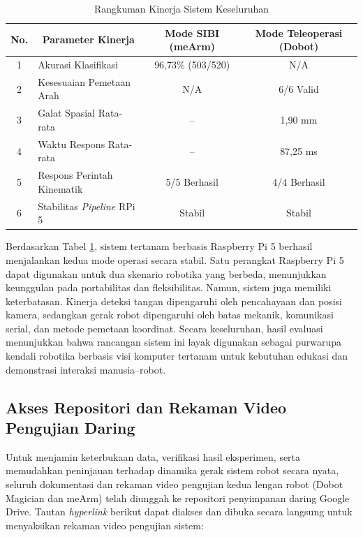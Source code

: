 \begin{table}[htbp]
\centering
\caption{Rangkuman Kinerja Sistem Keseluruhan}
\label{tab:rangkuman_kinerja}
\begin{tabular}{|c|p{4.5cm}|c|c|}
\hline
\textbf{No.} & \multicolumn{1}{c|}{\textbf{Parameter Kinerja}} & \textbf{Mode SIBI (meArm)} & \textbf{Mode Teleoperasi (Dobot)} \\ \hline
1 & Akurasi Klasifikasi & 96,73\% (503/520) & N/A \\ \hline
2 & Kesesuaian Pemetaan Arah & N/A & 6/6 Valid \\ \hline
3 & Galat Spasial Rata-rata & -- & 1,90 mm \\ \hline
4 & Waktu Respons Rata-rata & -- & 87,25 ms \\ \hline
5 & Respons Perintah Kinematik & 5/5 Berhasil & 4/4 Berhasil \\ \hline
6 & Stabilitas \textit{Pipeline} RPi 5 & Stabil & Stabil \\ \hline
\end{tabular}
\end{table}

Berdasarkan Tabel \ref{tab:rangkuman_kinerja}, sistem tertanam berbasis Raspberry Pi 5 berhasil menjalankan kedua mode operasi secara stabil. Satu perangkat Raspberry Pi 5 dapat digunakan untuk dua skenario robotika yang berbeda, menunjukkan keunggulan pada portabilitas dan fleksibilitas. Namun, sistem juga memiliki keterbatasan. Kinerja deteksi tangan dipengaruhi oleh pencahayaan dan posisi kamera, sedangkan gerak robot dipengaruhi oleh batas mekanik, komunikasi serial, dan metode pemetaan koordinat. Secara keseluruhan, hasil evaluasi menunjukkan bahwa rancangan sistem ini layak digunakan sebagai purwarupa kendali robotika berbasis visi komputer tertanam untuk kebutuhan edukasi dan demonstrasi interaksi manusia--robot.

\subsection{Akses Repositori dan Rekaman Video Pengujian Daring}
Untuk menjamin keterbukaan data, verifikasi hasil eksperimen, serta memudahkan peninjauan terhadap dinamika gerak sistem robot secara nyata, seluruh dokumentasi dan rekaman video pengujian kedua lengan robot (Dobot Magician dan meArm) telah diunggah ke repositori penyimpanan daring Google Drive. Tautan \textit{hyperlink} berikut dapat diakses dan dibuka secara langsung untuk menyaksikan rekaman video pengujian sistem:

